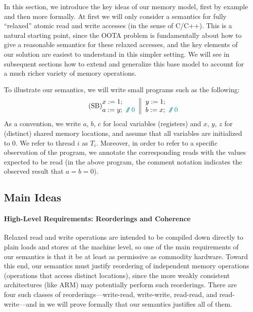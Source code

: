 In this section, we introduce the key ideas of our memory model, first
by example and then more formally.  At first we will only consider a
semantics for fully ``relaxed'' atomic read and write accesses (in the
sense of C/C++).  This is a natural starting point, since the OOTA
problem is fundamentally about how to give a reasonable semantics for
these relaxed accesses, and the key elements of our solution are
easiest to understand in this simpler setting.  We will see in
subsequent sections how to extend and generalize this base model to
account for a much richer variety of memory operations.

To illustrate our semantics, we will write small programs such as the
following:
\begin{equation}\label{eq:SB}\tag{SB}
\inarrII{x:=1;\\a:=y;\comment{0}}{y:=1;\\b:=x;\comment{0}}
\end{equation}
As a convention, we write $a$, $b$, $c$ for local variables
(registers) and $x$, $y$, $z$ for (distinct) shared memory locations,
and assume that all variables are initialized to $0$.  
We refer to thread $i$ as $T_i$.  Moreover, in order to
refer to a specific observation of the program, we annotate the
corresponding reads with the values expected to be read (\eg in the
above program, the comment notation indicates the observed result that
$a = b = 0$).

\subsection{Main Ideas}

\paragraph{High-Level Requirements: Reorderings and Coherence}

Relaxed read and write operations are intended to be compiled down
directly to plain loads and stores at the machine level, so one of the
main requirements of our semantics is that it be at least as
permissive as commodity hardware.  Toward this end, our semantics must
justify reordering of independent memory operations (\ie operations
that access distinct locations), since the more weakly consistent
architectures (like ARM) may potentially perform such reorderings.
There are four such classes of reorderings---write-read, write-write,
read-read, and read-write---and in  we will prove formally
that our semantics justifies all of them.

